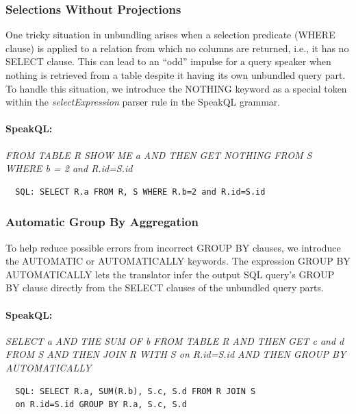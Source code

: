 \vspace{2mm}
\subsubsection{\textbf{Selections Without Projections}}

One tricky situation in unbundling arises when a selection predicate (WHERE clause) is applied to a relation from which no columns are returned, i.e., it has no SELECT clause. 
This can lead to an ``odd'' impulse for a query speaker when nothing is retrieved from a table despite it having its own unbundled query part. 
To handle this situation, we introduce the NOTHING keyword as a special token within the \emph{selectExpression} parser rule in the SpeakQL grammar. 


\paragraph{SpeakQL:} \emph{FROM TABLE R SHOW ME a AND THEN GET NOTHING FROM S WHERE b = 2 and R.id=S.id}

\vspace{2mm}
\begin{verbatim}
  SQL: SELECT R.a FROM R, S WHERE R.b=2 and R.id=S.id
\end{verbatim}


\vspace{1mm}
\subsubsection{\textbf{Automatic Group By Aggregation}}

To help reduce possible errors from incorrect GROUP BY clauses, we introduce the AUTOMATIC or AUTOMATICALLY keywords. 
The expression GROUP BY AUTOMATICALLY lets the translator infer the output SQL query's GROUP BY clause directly from the SELECT clauses of the unbundled query parts.

\paragraph{SpeakQL:} \emph{SELECT a AND THE SUM OF b FROM TABLE R AND THEN GET c and d FROM S AND THEN JOIN R WITH S on R.id=S.id AND THEN GROUP BY AUTOMATICALLY}

\vspace{2mm}
\begin{verbatim}
  SQL: SELECT R.a, SUM(R.b), S.c, S.d FROM R JOIN S
  on R.id=S.id GROUP BY R.a, S.c, S.d
\end{verbatim}



